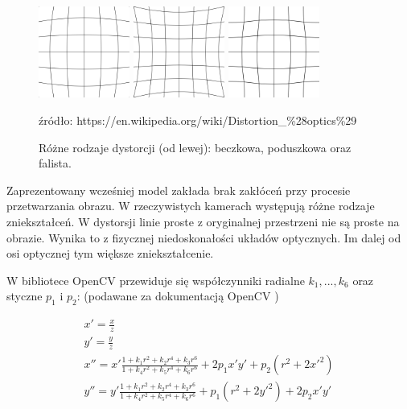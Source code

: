 \documentclass[oneside, eng]{mgr}
\begin{document}
\begin{figure}
\centering
		\begin{minipage}{3cm}
			\includegraphics[width=3cm]{600px-Barrel_distortion.png}
		\end{minipage}
		\begin{minipage}{3cm}
			\includegraphics[width=3cm]{600px-Pincushion_distortion.png}
		\end{minipage}
		\begin{minipage}{3cm}
			\includegraphics[width=3cm]{600px-Mustache_distortion.png}
		\end{minipage}
	\caption{Różne rodzaje dystorcji (od lewej): beczkowa, poduszkowa oraz falista.}
źródło: https://en.wikipedia.org/wiki/Distortion\_\%28optics\%29
	\label{fig:distortion}
\end{figure}

Zaprezentowany wcześniej model zakłada brak zakłóceń przy procesie przetwarzania obrazu. W rzeczywistych kamerach występują różne rodzaje zniekształceń. W dystorsji linie proste z oryginalnej przestrzeni nie są proste na obrazie. Wynika to z fizycznej niedoskonałości układów optycznych. Im dalej od osi optycznej tym większe zniekształcenie.

W bibliotece OpenCV przewiduje się współczynniki radialne $k_1, ..., k_6$ oraz styczne $p_1$ i $p_2$:
(podawane za dokumentacją OpenCV \cite{Dokumentacja OpenCV})

\begin{gather*}
	x' = \frac{x}{z} \\
	y' = \frac{y}{z} \\
	x'' = x' \frac{1+k_1 r^2 + k_2 r^4 + k_3 r^6}{1+k_4 r^2+k_5 r^4+k_6 r^6} +
	2 p_1 x' y' + p_2(r^2 + 2 x'^2)	\\
	y'' = y' \frac{1+k_1 r^2 + k_2 r^4 + k_3 r^6}{1+k_4 r^2+k_5 r^4+k_6 r^6} +
	p_1(r^2 + 2 y'^2) + 2 p_2 x' y'
\end{gather*}
\end{document}
